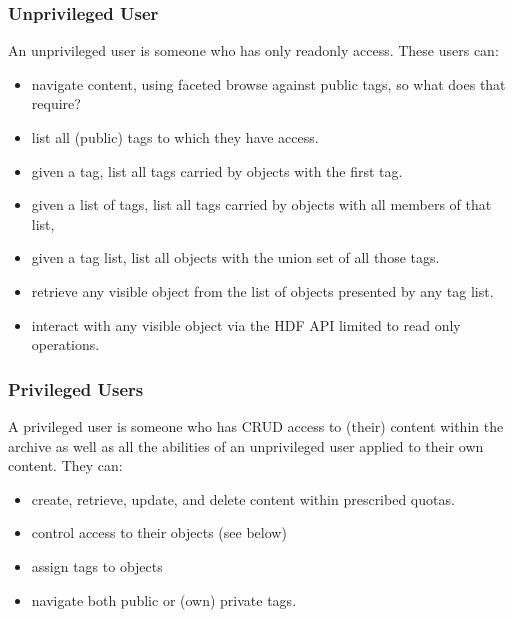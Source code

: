 \documentclass{../../template/esiwace-report}
\begin{document}
\subsubsection{Unprivileged User}

An unprivileged user is someone who has only readonly access. These users can:
\begin{itemize}
\item navigate content, using faceted browse against public tags, so what does that require?
\item list all (public) tags to which they have access.
\item given a tag, list all tags carried by objects with the first tag.
\item given a list of tags, list all tags carried by objects with all members of that list,
\item given a tag list, list all objects with the union set of all those tags.
\item retrieve any visible object from the list of objects presented by any tag list.
\item interact with any visible object via the HDF API limited to read only operations.
\end{itemize}



\subsubsection{Privileged Users}

A privileged user is someone who has CRUD access to (their) content within the archive as well as all the abilities of an unprivileged user applied to their own content. They can:
\begin{itemize}
\item create, retrieve, update, and delete content within prescribed quotas.
\item control access to their objects (see below) 
\item assign tags to objects
\item navigate both public or (own) private tags.
\end{itemize}
\end{document}
